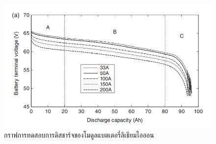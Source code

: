 \begin{center}
	\begin{figure}[!h]
		\includegraphics[width=0.6\linewidth]{Chapters/img/IV_a.png}
			\centering
			\captionsetup{justification=centering,margin=2cm}
			\caption{กราฟการทดสอบการดิสชาร์จของโมดูลแบตเตอรี่ลิเธียมไอออน}
	\end{figure}
\end{center}
